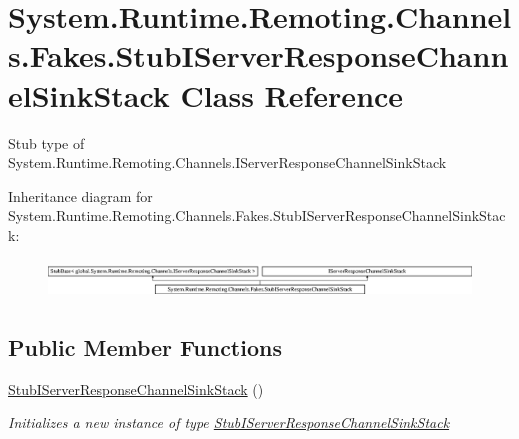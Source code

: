\hypertarget{class_system_1_1_runtime_1_1_remoting_1_1_channels_1_1_fakes_1_1_stub_i_server_response_channel_sink_stack}{\section{System.\-Runtime.\-Remoting.\-Channels.\-Fakes.\-Stub\-I\-Server\-Response\-Channel\-Sink\-Stack Class Reference}
\label{class_system_1_1_runtime_1_1_remoting_1_1_channels_1_1_fakes_1_1_stub_i_server_response_channel_sink_stack}
}


Stub type of System.\-Runtime.\-Remoting.\-Channels.\-I\-Server\-Response\-Channel\-Sink\-Stack 


Inheritance diagram for System.\-Runtime.\-Remoting.\-Channels.\-Fakes.\-Stub\-I\-Server\-Response\-Channel\-Sink\-Stack\-:\begin{figure}[H]
\begin{center}
\leavevmode
\includegraphics[height=1.040892cm]{class_system_1_1_runtime_1_1_remoting_1_1_channels_1_1_fakes_1_1_stub_i_server_response_channel_sink_stack}
\end{center}
\end{figure}
\subsection*{Public Member Functions}
\begin{DoxyCompactItemize}
\item 
\hyperlink{class_system_1_1_runtime_1_1_remoting_1_1_channels_1_1_fakes_1_1_stub_i_server_response_channel_sink_stack_a585ae2cab92e339f9ad623f68b0d6f43}{Stub\-I\-Server\-Response\-Channel\-Sink\-Stack} ()
\begin{DoxyCompactList}\small\item\em Initializes a new instance of type \hyperlink{class_system_1_1_runtime_1_1_remoting_1_1_channels_1_1_fakes_1_1_stub_i_server_response_channel_sink_stack}{Stub\-I\-Server\-Response\-Channel\-Sink\-Stack}\end{DoxyCompactList}\end{DoxyCompactItemize}
